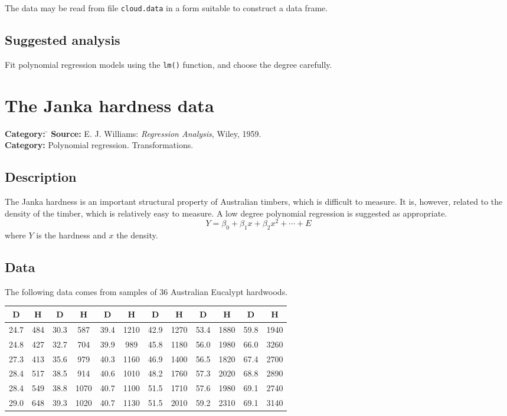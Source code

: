 \documentclass{article}
\newcommand{\strutt}{\vrule height 2.5ex depth 0.5ex width 0ex}%
\newcommand{\code}[1]{\texttt{#1}}
\begin{document}
The data may be read from file \code{cloud.data} in a form suitable to
construct a data frame.

\subsection*{Suggested analysis}
Fit polynomial regression models using the \code{lm()} function, and choose
the degree carefully.

\clearpage\section{The Janka hardness data}
\begin{tabbing}
\textbf{Category:} \= \kill
\textbf{Source:} \> E. J. Williams: \textit{Regression Analysis}, Wiley, 1959.\\
\textbf{Category:} \> Polynomial regression.  Transformations.
\end{tabbing}

\subsection*{Description}
The Janka hardness is an important structural property of Australian
timbers, which is difficult to measure.  It is, however, related to the
density of the timber, which is relatively easy to measure.  A low degree
polynomial regression is suggested as appropriate.
\[
Y = \beta_0+\beta_1x+\beta_2x^2+\cdots+E
\]
where $Y$ is the hardness and $x$ the density.

\subsection*{Data}
The following data comes from samples of 36 Australian Eucalypt hardwoods.
\begin{center}
\def\0{\hphantom{0}}
\begin{tabular}{@{\protect\strutt}|cc|cc|cc|cc|cc|cc|}
\hline
D & H & D & H & D & H & D & H & D & H & D & H \\
\hline
 24.7 & 484 & 30.3 &\0587 & 39.4 & 1210 & 42.9 & 1270 & 53.4 & 1880 & 59.8 & 1940\\
 24.8 & 427 & 32.7 &\0704 & 39.9 &\0989 & 45.8 & 1180 & 56.0 & 1980 & 66.0 & 3260\\
 27.3 & 413 & 35.6 &\0979 & 40.3 & 1160 & 46.9 & 1400 & 56.5 & 1820 & 67.4 & 2700\\
 28.4 & 517 & 38.5 &\0914 & 40.6 & 1010 & 48.2 & 1760 & 57.3 & 2020 & 68.8 & 2890\\
 28.4 & 549 & 38.8 & 1070 & 40.7 & 1100 & 51.5 & 1710 & 57.6 & 1980 & 69.1 & 2740\\
 29.0 & 648 & 39.3 & 1020 & 40.7 & 1130 & 51.5 & 2010 & 59.2 & 2310 & 69.1 & 3140\\
\hline
\end{tabular}
\end{center}
\end{document}
